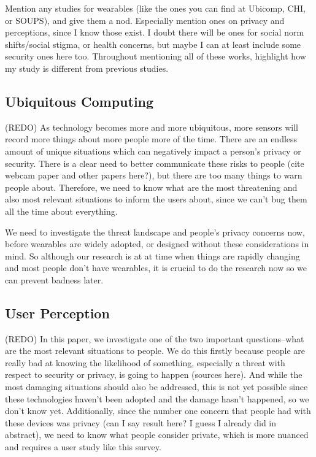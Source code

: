\documentclass{acm_proc_article-sp}
\begin{document}
Mention any studies for wearables (like the ones you can find at Ubicomp, CHI, or SOUPS), and give them a nod. Especially mention ones on privacy and perceptions, since I know those exist. I doubt there will be ones for social norm shifts/social stigma, or health concerns, but maybe I can at least include some security ones here too. Throughout mentioning all of these works, highlight how my study is different from previous studies. 

\subsection{Ubiquitous Computing}
(REDO) As technology becomes more and more ubiquitous, more sensors will record more things about more people more of the time. There are an endless amount of unique situations which can negatively impact a person's privacy or security. There is a clear need to better communicate these risks to people (cite webcam paper and other papers here?), but there are too many things to warn people about. Therefore, we need to know what are the most threatening and also most relevant situations to inform the users about, since we can't bug them all the time about everything. 

We need to investigate the threat landscape and people's privacy concerns now, before wearables are widely adopted, or designed without these considerations in mind. So although our research is at at time when things are rapidly changing and most people don't have wearables, it is crucial to do the research now so we can prevent badness later.

\subsection{User Perception}
(REDO) In this paper, we investigate one of the two important questions--what are the most relevant situations to people. We do this firstly because people are really bad at knowing the likelihood of something, especially a threat with respect to security or privacy, is going to happen (sources here). And while the most damaging situations should also be addressed, this is not yet possible since these technologies haven't been adopted and the damage hasn't happened, so we don't know yet. Additionally, since the number one concern that people had with these devices was privacy (can I say result here? I guess I already did in abstract), we need to know what people consider private, which is more nuanced and requires a user study like this survey. 
\end{document}
